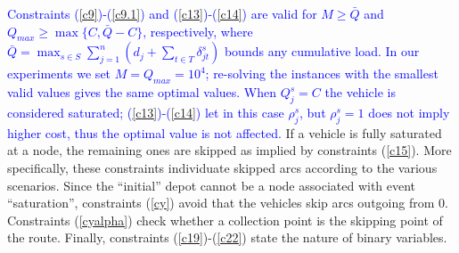 \documentclass[authoryear,preprint,12pt]{elsarticle}
\newcommand{\rev}[1]{\textcolor{blue}{{#1}}}
\begin{document}
\rev{Constraints (\ref{c9})-(\ref{c9.1}) and (\ref{c13})-(\ref{c14}) are valid for $M\ge\bar Q$ and $Q_{max}\ge\max\{C,\bar Q-C\}$, respectively, where $\bar Q=\max_{s\in S}\sum_{j=1}^n(d_j+\sum_{t\in T}\delta^s_{jt})$ bounds any cumulative load. In our experiments we set $M=Q_{max}=10^4$; re-solving the instances with the smallest valid values gives the same optimal values. When $Q^s_j=C$ the vehicle is considered saturated; (\ref{c13})-(\ref{c14}) let in this case $\rho^s_j$, but $\rho^s_j=1$ does not imply higher cost, thus the optimal value is not affected.}
If a vehicle is fully saturated at a node, the remaining ones are skipped as implied by constraints (\ref{c15}). More specifically, these constraints individuate skipped arcs according to the various scenarios. Since the ``initial'' depot cannot be a node associated with event ``saturation'', constraints (\ref{cy}) avoid that the vehicles skip arcs outgoing from $0$.  
Constraints (\ref{cyalpha}) check whether a collection point is %
the skipping point of the route. Finally, constraints (\ref{c19})-(\ref{c22}) state the nature of binary variables.



\end{document}
